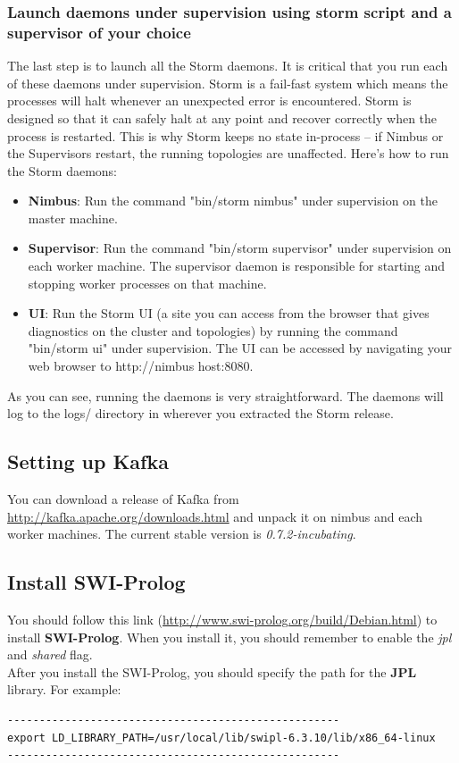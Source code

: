 \documentclass[a4paper, 12pt]{article}
\begin{document}
\subsubsection{Launch daemons under supervision using storm script and a supervisor of your choice}
The last step is to launch all the Storm daemons. It is critical that you run each of these daemons under supervision. Storm is a fail-fast system which means the processes will halt whenever an unexpected error is encountered. Storm is designed so that it can safely halt at any point and recover correctly when the process is restarted. This is why Storm keeps no state in-process -- if Nimbus or the Supervisors restart, the running topologies are unaffected. Here's how to run the Storm daemons:
\begin{itemize}
\item \textbf{Nimbus}: Run the command "bin/storm nimbus" under supervision on the master machine.
\item \textbf{Supervisor}: Run the command "bin/storm supervisor" under supervision on each worker machine. The supervisor daemon is responsible for starting and stopping worker processes on that machine.
\item \textbf{UI}: Run the Storm UI (a site you can access from the browser that gives diagnostics on the cluster and topologies) by running the command "bin/storm ui" under supervision. The UI can be accessed by navigating your web browser to http://{nimbus host}:8080.
\end{itemize}
As you can see, running the daemons is very straightforward. The daemons will log to the logs/ directory in wherever you extracted the Storm release.

\subsection{Setting up Kafka}
You can download a release of Kafka from \url{http://kafka.apache.org/downloads.html} and unpack it on nimbus and each worker machines. The current stable version is \textit{0.7.2-incubating}.

\subsection{Install SWI-Prolog}
You should follow this link (\url{http://www.swi-prolog.org/build/Debian.html}) to install \textbf{SWI-Prolog}. When you install it, you should remember to enable the \textit{jpl} and \textit{shared} flag.\\
After you install the SWI-Prolog, you should specify the path for the \textbf{JPL} library. For example:
\begin{lstlisting}
----------------------------------------------------
export LD_LIBRARY_PATH=/usr/local/lib/swipl-6.3.10/lib/x86_64-linux
----------------------------------------------------
\end{lstlisting} 
\end{document}
